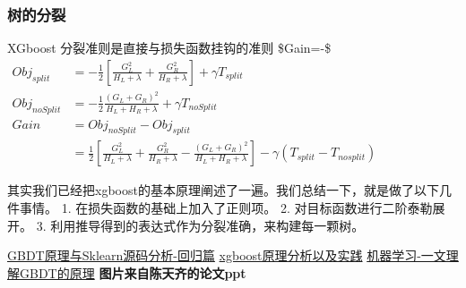 \documentclass[11pt]{article}
\begin{document}
    

    \subsubsection{树的分裂}\label{ux6811ux7684ux5206ux88c2}

XGboost 分裂准则是直接与损失函数挂钩的准则
\$Gain=-\gamma \$
\(\begin{align}  Obj_{split} &= - \frac 1 2 [\frac {G_L^2}{H_L + \lambda} + \frac {G_R^2}{H_R + \lambda}] + \gamma T_{split} \\  Obj_{noSplit} &= - \frac 1 2 \frac {(G_L + G_R)^2}{H_L + H_R + \lambda} + \gamma T_{noSplit} \\  Gain &= Obj_{noSplit} - Obj_{split} \\  &= \frac 1 2 [\frac {G_L^2}{H_L + \lambda} + \frac {G_R^2}{H_R + \lambda} - \frac {(G_L + G_R)^2}{H_L + H_R + \lambda}] - \gamma(T_{split} - T_{nosplit}) \end{align}\)

    其实我们已经把xgboost的基本原理阐述了一遍。我们总结一下，就是做了以下几件事情。
1. 在损失函数的基础上加入了正则项。 2. 对目标函数进行二阶泰勒展开。 3.
利用推导得到的表达式作为分裂准确，来构建每一颗树。

    \href{https://blog.csdn.net/qq_22238533/article/details/79185969}{GBDT原理与Sklearn源码分析-回归篇}
\href{https://blog.csdn.net/qq_22238533/article/details/79477547}{xgboost原理分析以及实践}
\href{https://zhuanlan.zhihu.com/p/29765582}{机器学习-一文理解GBDT的原理}
\textbf{图片来自陈天齐的论文ppt}


    
    
    
    
\end{document}
